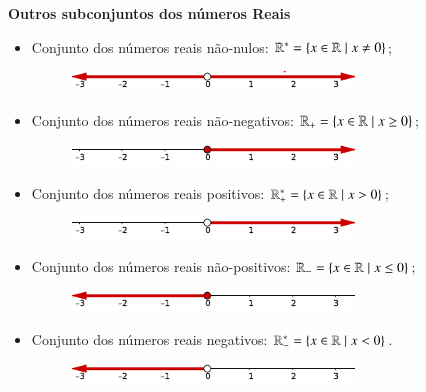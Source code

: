\textbf{Outros subconjuntos dos números Reais}
\begin{itemize}
 \item Conjunto dos números reais não-nulos: $\mathbb{R}^{*}=\{x \in \mathbb{R} \mid x \neq 0\}$;
 \begin{figure}[H]
 \centering
 \includegraphics[width=7.5cm]{../Topicos/Figuras/n-nulos.pdf}
 \end{figure}
 \item Conjunto dos números reais não-negativos: $\mathbb{R}_{+}=\{x \in \mathbb{R} \mid x \geq 0\}$;
 \begin{figure}[H]
 \centering
 \includegraphics[width=7.5cm]{../Topicos/Figuras/n-negativos.pdf}
 \end{figure}
 \item Conjunto dos números reais positivos: $\mathbb{R}^{*}_{+}=\{x \in \mathbb{R} \mid x > 0\}$;
 \begin{figure}[H]
 \centering
 \includegraphics[width=7.5cm]{../Topicos/Figuras/positivos.pdf}
 \end{figure}
 \item Conjunto dos números reais não-positivos: $\mathbb{R}_{-}=\{x \in \mathbb{R} \mid x \leq 0\}$;
 \begin{figure}[H]
 \centering
 \includegraphics[width=7.5cm]{../Topicos/Figuras/n-positivos.pdf}
 \end{figure}
 \item Conjunto dos números reais negativos: $\mathbb{R}^{*}_{-}=\{x \in \mathbb{R} \mid x < 0\}$.
 \begin{figure}[H]
 \centering
 \includegraphics[width=7.5cm]{../Topicos/Figuras/negativos.pdf}
 \end{figure}
\end{itemize}

